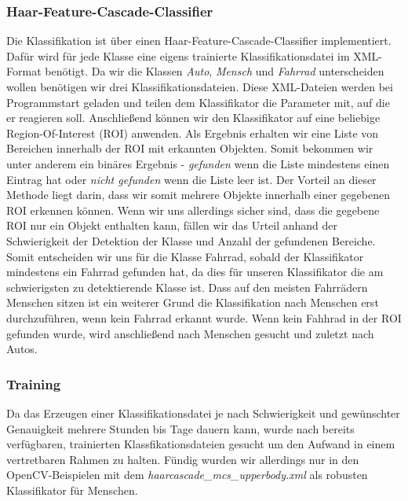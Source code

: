 \documentclass[conference]{IEEEtran}
\begin{document}
\subsubsection{Haar-Feature-Cascade-Classifier}

Die Klassifikation ist über einen Haar-Feature-Cascade-Classifier implementiert.
Dafür wird für jede Klasse eine eigens trainierte Klassifikationsdatei im XML-Format benötigt. Da wir die Klassen \textit{Auto}, \textit{Mensch} und \textit{Fahrrad} unterscheiden wollen benötigen wir drei Klassifikationsdateien. Diese XML-Dateien werden bei Programmstart geladen und teilen dem Klassifikator die Parameter mit, auf die er reagieren soll. Anschließend können wir den Klassifikator auf eine beliebige Region-Of-Interest (ROI) anwenden. Als Ergebnis erhalten wir eine Liste von Bereichen innerhalb der ROI mit erkannten Objekten. Somit bekommen wir unter anderem ein binäres Ergebnis - \textit{gefunden} wenn die Liste mindestens einen Eintrag hat oder \textit{nicht gefunden} wenn die Liste leer ist. Der Vorteil an dieser Methode liegt darin, dass wir somit mehrere Objekte innerhalb einer gegebenen ROI erkennen können. Wenn wir uns allerdings sicher sind, dass die gegebene ROI nur ein Objekt enthalten kann, fällen wir das Urteil anhand der Schwierigkeit der Detektion der Klasse und Anzahl der gefundenen Bereiche. Somit entscheiden wir uns für die Klasse Fahrrad, sobald der Klassifikator mindestens ein Fahrrad gefunden hat, da dies für unseren Klassifikator die am schwierigsten zu detektierende Klasse ist. Dass auf den meisten Fahrrädern Menschen sitzen ist ein weiterer Grund die Klassifikation nach Menschen erst durchzuführen, wenn kein Fahrrad erkannt wurde.
Wenn kein Fahhrad in der ROI gefunden wurde, wird anschließend nach Menschen gesucht und zuletzt nach Autos.

\subsubsection{Training}

Da das Erzeugen einer Klassifikationsdatei je nach Schwierigkeit und gewünschter Genauigkeit mehrere Stunden bis Tage dauern kann, wurde nach bereits verfügbaren, trainierten Klassfikationsdateien gesucht um den Aufwand in einem vertretbaren Rahmen zu halten. Fündig wurden wir allerdings nur in den OpenCV-Beispielen mit dem \textit{haarcascade\_mcs\_upperbody.xml} als robusten Klassifikator für Menschen.
\end{document}
